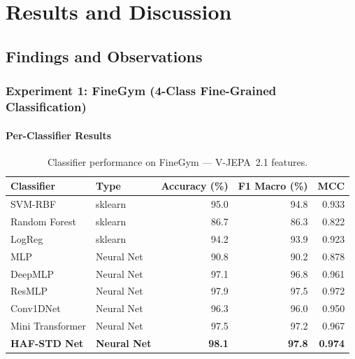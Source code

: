 \chapter{Results and Discussion}

\section{Findings and Observations}

\subsection{Experiment 1: FineGym (4-Class Fine-Grained Classification)}

\subsubsection{Per-Classifier Results}

\begin{table}[H]
\centering
\caption{Classifier performance on FineGym --- V-JEPA~2.1 features.}
\label{tab:fg_vjepa_clf}
\begin{tabular}{llrrr}
\toprule
\textbf{Classifier} & \textbf{Type} & \textbf{Accuracy (\%)} & \textbf{F1 Macro (\%)} & \textbf{MCC} \\
\midrule
SVM-RBF       & sklearn & 95.0 & 94.8 & 0.933 \\
Random Forest & sklearn & 86.7 & 86.3 & 0.822 \\
LogReg        & sklearn & 94.2 & 93.9 & 0.923 \\
\midrule
MLP           & Neural Net & 90.8 & 90.2 & 0.878 \\
DeepMLP       & Neural Net & 97.1 & 96.8 & 0.961 \\
ResMLP        & Neural Net & 97.9 & 97.5 & 0.972 \\
Conv1DNet     & Neural Net & 96.3 & 96.0 & 0.950 \\
Mini Transformer & Neural Net & 97.5 & 97.2 & 0.967 \\
\textbf{HAF-STD Net} & \textbf{Neural Net} & \textbf{98.1} & \textbf{97.8} & \textbf{0.974} \\
\bottomrule
\end{tabular}
\end{table}

